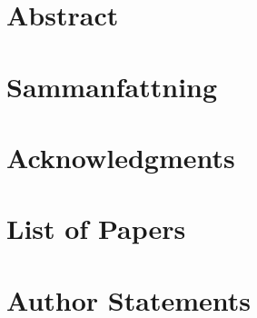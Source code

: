 \documentclass[11pt,twoside,english,s5paper]{book}
\begin{document}


 
\chapter{Abstract}

\chapter{Sammanfattning}

\chapter{Acknowledgments}

\chapter{List of Papers}
 
\chapter{Author Statements}


\tableofcontents





 


 







\end{document}
